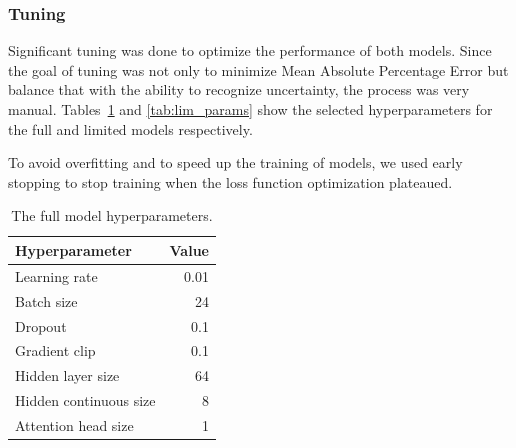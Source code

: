     \pagebreak
    \subsubsection{Tuning}
        Significant tuning was done to optimize the performance of both models. Since the goal of tuning was not only to minimize Mean Absolute Percentage Error but balance that with the ability to recognize uncertainty, the process was very manual. Tables~\ref{tab:full_params} and \ref{tab:lim_params} show the selected hyperparameters for the full and limited models respectively.
        
        To avoid overfitting and to speed up the training of models, we used early stopping to stop training when the loss function optimization plateaued. 
        
        \vspace{1.5cm}
    
        \begin{table}[ht!]
        \begin{center}
        \caption{The full model hyperparameters.
        \label{tab:full_params}}
        \vspace{0.5cm}
        \begin{tabular}{|l|r|}
        \hline
        \textbf{Hyperparameter} & \textbf{Value} \\ \hline
        Learning rate            & 0.01         \\ \hline
        Batch size              & 24            \\ \hline
        Dropout                 & 0.1            \\ \hline
        Gradient clip           & 0.1           \\ \hline
        Hidden layer size            & 64         \\ \hline
        Hidden continuous size & 8         \\ \hline
        Attention head size   & 1         \\ \hline
        \end{tabular}
        
        \end{center}
        \end{table}
        
